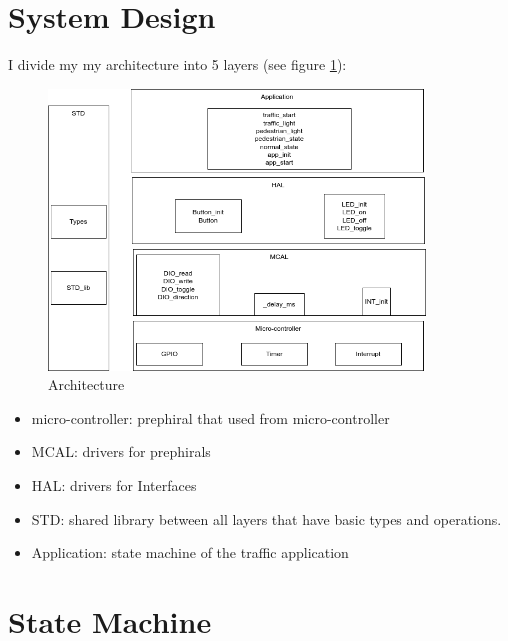 \documentclass[pdftex,10pt,a4paper,oneside]{article}
\begin{document}
\section{System Design}
I divide my my architecture into 5 layers (see figure \ref{s}):
\begin{figure}[H]
  \centering
  \includegraphics[width=100mm,scale=5]{architecture.png}
  \caption{Architecture}
  \label{s}
\end{figure}
 \begin{itemize}
	\item micro-controller: prephiral that used from micro-controller
	\item MCAL: drivers for prephirals
	\item HAL: drivers for Interfaces
	\item STD: shared library between all layers that have basic types and operations.
	\item Application: state machine of the traffic application
 \end{itemize}

\section{State Machine}
\end{document}
